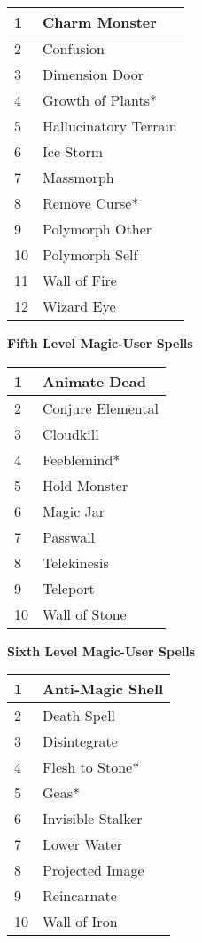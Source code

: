 \documentclass[a4paper,twoside,openany,10pt]{book}
\begin{document}
\begin{multicols}{2}
\begin{tabularx}{0.45\textwidth}{@{}ll@{}}
1 & Charm Monster \\\toprule
2 & Confusion \\\hline
3 & Dimension Door \\\hline
4 & Growth of Plants* \\\hline
5 & Hallucinatory Terrain \\\hline
6 & Ice Storm \\\hline
7 & Massmorph \\\hline
8 & Remove Curse* \\\hline
9 & Polymorph Other \\\hline
10 & Polymorph Self \\\hline
11 & Wall of Fire \\\hline
12 & Wizard Eye \\\bottomrule
\end{tabularx}\bigskip

{\large \textbf{Fifth Level Magic-User Spells}}\\

\begin{tabularx}{0.45\textwidth}{@{}ll@{}}
1 & Animate Dead \\\toprule
2 & Conjure Elemental \\\hline
3 & Cloudkill \\\hline
4 & Feeblemind* \\\hline
5 & Hold Monster \\\hline
6 & Magic Jar \\\hline
7 & Passwall \\\hline
8 & Telekinesis \\\hline
9 & Teleport \\\hline
10 & Wall of Stone \\\bottomrule
\end{tabularx}\bigskip

\textbf{{\large Sixth Level Magic-User Spells}}\\

\begin{tabularx}{0.45\textwidth}{@{}ll@{}}
1 & Anti-Magic Shell \\\toprule
2 & Death Spell \\\hline
3 & Disintegrate \\\hline
4 & Flesh to Stone* \\\hline
5 & Geas* \\\hline
6 & Invisible Stalker \\\hline
7 & Lower Water \\\hline
8 & Projected Image \\\hline
9 & Reincarnate \\\hline
10 & Wall of Iron \\\bottomrule
\end{tabularx}

\end{multicols}
\end{document}

